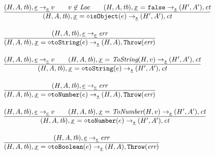 \documentclass[a4paper, leqno]{amsart}
\newcommand{\rulesep}{\quad\quad}
\newcommand{\stmt}{s}
\newcommand{\expr}{e}
\newcommand{\ir}[1]{\ensuremath{\underline{#1}}}
\newcommand{\irid}{\ir{x}}
\newcommand{\false}{{\tt false}}
\newcommand{\tb}{\emph{tb}}
\newcommand{\err}{\emph{err}}
\newcommand{\Loc}{\emph{Loc}}
\newcommand{\ct}{\emph{ct}}
\newcommand{\hf}[1]{\emph{#1}}
\newcommand{\error}{\ensuremath{{\tt Throw}(\err)}}
\newcommand{\state}{\ensuremath{(H,A,\tb)}}
\newcommand{\res}{\ensuremath{(H,A)}}
\newcommand{\resp}{\ensuremath{(H',A')}}
\newcommand{\evale}{\ensuremath{(H,A,\tb)}}
\begin{document}
\[\begin{array}{l@{~~}l@{~~}ll}
\frac{\begin{matrix}
\evale, \ir{\expr} \rightarrow_{\ir\expr} v
\rulesep
v\not\in\Loc
\rulesep
\state, \irid \ {\tt =} \ \false \rightarrow_{\ir\stmt} \resp, \ct
\end{matrix}}{\begin{matrix}
\state, \irid \ {\tt = {\diamond}isObject}(e)  \rightarrow_{\ir\stmt} \resp, \ct
\end{matrix}}
\\[2em]

\frac{\begin{matrix}
\evale, \ir{\expr} \rightarrow_{\ir\expr} \err
\end{matrix}}{\begin{matrix}
\state, \irid \ {\tt = {\diamond}toString}(e)  \rightarrow_{\ir\stmt} \res, \error
\end{matrix}}
\\[2em]

\frac{\begin{matrix}
\evale, \ir{\expr} \rightarrow_{\ir\expr} v
\rulesep
\state, \irid \ {\tt =} \ \hf{ToString}(H,v) \rightarrow_{\ir\stmt} \resp, \ct
\end{matrix}}{\begin{matrix}
\state, \irid \ {\tt = {\diamond}toString}(e)  \rightarrow_{\ir\stmt} \resp, \ct
\end{matrix}}
\\[2em]

\frac{\begin{matrix}
\evale, \ir{\expr} \rightarrow_{\ir\expr} \err
\end{matrix}}{\begin{matrix}
\state, \irid \ {\tt = {\diamond}toNumber}(e)  \rightarrow_{\ir\stmt} \res, \error
\end{matrix}}
\\[2em]

\frac{\begin{matrix}
\evale, \ir{\expr} \rightarrow_{\ir\expr} v
\rulesep
\state, \irid \ {\tt =} \ \hf{ToNumber}(H,v) \rightarrow_{\ir\stmt} \resp, \ct
\end{matrix}}{\begin{matrix}
\state, \irid \ {\tt = {\diamond}toNumber}(e)  \rightarrow_{\ir\stmt} \resp, \ct
\end{matrix}}
\\[2em]

\frac{\begin{matrix}
\evale, \ir{\expr} \rightarrow_{\ir\expr} \err
\end{matrix}}{\begin{matrix}
\state, \irid \ {\tt = {\diamond}toBoolean}(e)  \rightarrow_{\ir\stmt} \res, \error
\end{matrix}}
\\[2em]


\end{array}\]
\end{document}
